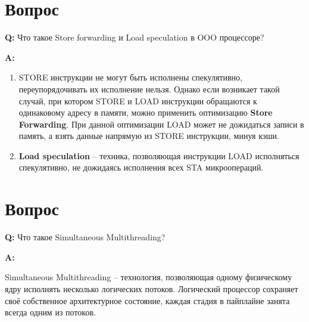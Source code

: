 \documentclass[12pt, letterpaper]{article}
\begin{document}
\newpage

\section{Вопрос}

\textbf{Q: } Что такое Store forwarding и Load speculation в OOO процессоре?

\textbf{A: }

\begin{enumerate}
    \item STORE инструкции не могут быть исполнены спекулятивно, переупорядочивать их исполнение нельзя.
    Однако если возникает такой случай, при котором STORE и LOAD инструкции обращаются к одинаковому адресу в памяти, можно применить оптимизацию \textbf{Store Forwarding}.
    При данной оптимизации LOAD может не дожидаться записи в память, а взять данные напрямую из STORE инструкции, минуя кэши.

    \item \textbf{Load speculation} -- техника, позволяющая инструкции LOAD исполняться спекулятивно, не дожидаясь исполнения всех STA микроопераций.
\end{enumerate}

\newpage

\section{Вопрос}

\textbf{Q: } Что такое Simultaneous Multithreading?

\textbf{A: }

Simultaneous Multithreading -- технология, позволяющая одному физическому ядру исполнять несколько логических потоков.
Логический процессор сохраняет своё собственное архитектурное состояние, каждая стадия в пайплайне занята всегда одним из потоков.
\end{document}
